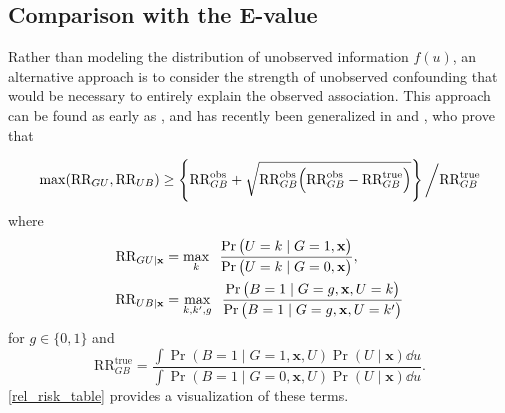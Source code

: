 \documentclass[aoas,preprint, 11pt, dvipsnames, table, x11name]{imsart}
\renewcommand{\bm}[1]{\mathbf{#1}}
\theoremstyle{remark}
\begin{document}
	
	\subsection{Comparison with the E-value}\label{E-value-comparison}
	Rather than modeling the distribution of unobserved information $f(u)$, an alternative approach is to consider the strength of unobserved confounding that would be necessary to entirely explain the observed association. This approach can be found as early as \cite{Cornfield}, and has recently been generalized in \cite{evalue} and \cite{Peng-2016}, who prove that 
	
	\begin{equation}
		\max(\text{RR}_{GU}, \text{RR}_{UB})\geq \cbr{\text{RR}^{\text{obs}}_{GB}+\sqrt{\text{RR}^{\text{obs}}_{GB}\qty(\text{RR}^{\text{obs}}_{GB}-\text{RR}^{\text{true}}_{GB})}}\bigg{/}\text{RR}^{\text{true}}_{GB}
		\label{high_thresh}
	\end{equation}
	where
	\begin{align*}
		\text{RR}_{GU\mid \bm{x}} &= \max_{k} \;\;  \frac{\Pr\qty(U=k\mid G=1, \bm{x})}{\Pr\qty(U=k\mid G=0, \bm{x})},\\
		\text{RR}_{UB\mid \bm{x}} &= \max_{k,k',g} \;\; \frac{\Pr\qty(B=1\mid G=g, \bm{x}, U=k)}{\Pr\qty(B=1\mid G=g, \bm{x}, U=k')} 
	\end{align*}
	for $g \in \lbrace 0,1\rbrace$ and
	\begin{equation}
		\text{RR}^{\text{true}}_{GB}=\frac{\int \Pr(B=1\mid G=1, \bm{x}, U)\Pr(U\mid \bm{x})\dd u}{\int \Pr(B=1\mid G=0, \bm{x}, U)\Pr(U\mid \bm{x})\dd u}.
		\label{true_causal_rr}
	\end{equation} 
	\autoref{rel_risk_table} provides a visualization of these terms.
	
\end{document}
